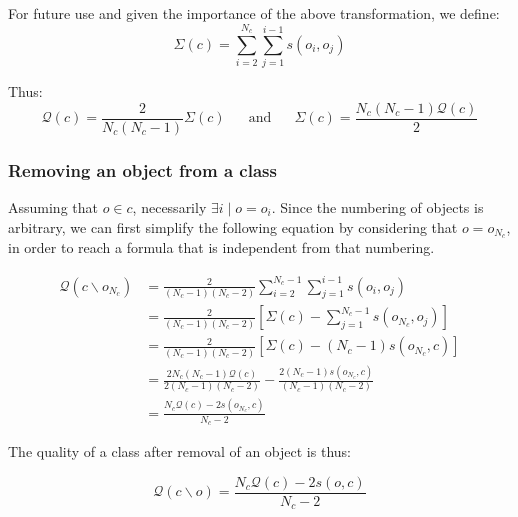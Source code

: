 \documentclass[a4paper,twoside]{article}
\begin{document}
For future use and given the importance of the above transformation, we define:
\begin{equation}
  \Sigma(c) = \sum_{i=2}^{N_c} \sum_{j=1}^{i-1} s\left(o_i, o_j\right)
\end{equation}

Thus:
\begin{equation}
    \mathcal{Q}\left(c\right) = \frac{2}{N_c(N_c-1)}\Sigma(c) \phantom{XX}\mathrm{and}\phantom{XX} \Sigma(c) = \frac{N_c(N_c-1)\mathcal{Q}\left(c\right)}{2}
\end{equation}


\subsubsection{Removing an object from a class}

Assuming that $o \in c$, necessarily $\exists i \mid o=o_i$. Since the numbering of objects is arbitrary, we can first simplify the following equation by considering that $o = o_{N_c}$, in order to reach a formula that is independent from that numbering.


\begin{equation}
  \begin{aligned}
    \mathcal{Q}\left(c \smallsetminus o_{N_c}\right) & = \frac{2}{(N_c-1)(N_c-2)} \sum_{i=2}^{N_c-1} \sum_{j=1}^{i-1} s\left(o_i, o_j\right) \\
                                                   & = \frac{2}{(N_c-1)(N_c-2)} \left[\Sigma(c) - \sum_{j=1}^{N_c-1} s\left(o_{N_c}, o_j\right) \right] \\
                                                   & = \frac{2}{(N_c-1)(N_c-2)} \left[\Sigma(c) - (N_c-1)s\left(o_{N_c}, c\right) \right] \\
                                                   & = \frac{2N_c(N_c-1)\mathcal{Q}(c)}{2(N_c-1)(N_c-2)} - \frac{2(N_c-1)s\left(o_{N_c}, c\right)}{(N_c-1)(N_c-2)}\\
                                                   & = \frac{N_c \mathcal{Q}(c)  - 2s\left(o_{N_c}, c\right)}{N_c-2}
  \end{aligned}
\end{equation}

The quality of a class after removal of an object is thus:

\begin{equation}
  \mathcal{Q}\left(c \smallsetminus o\right) = \frac{N_c \mathcal{Q}(c)  - 2s\left(o, c\right)}{N_c-2}
  \label{eq:newQual_remove}
\end{equation}
\end{document}
